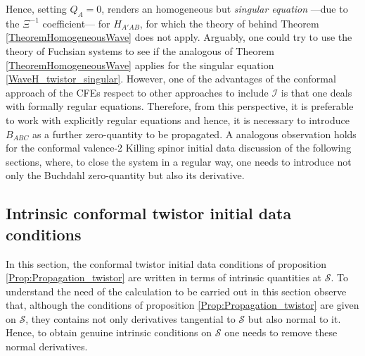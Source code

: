 \documentclass[10pt,a4paper]{article}
\theoremstyle{plain}
\begin{document}
Hence, setting $Q_{A}=0$, renders an homogeneous but
\emph{singular equation} ---due to the $\Xi^{-1}$ coefficient---
for $H_{A'AB}$, for which the theory of behind Theorem
\ref{TheoremHomogeneousWave} does not apply. Arguably, one could try
to use the theory of Fuchsian systems to see if the analogous of
Theorem \ref{TheoremHomogeneousWave} applies for the singular equation
\eqref{WaveH_twistor_singular}.  However, one of the advantages of the
conformal approach of the CFEs respect to other approaches to include
$\mathscr{I}$ is that one deals with formally regular equations.
Therefore, from this perspective,
it is preferable to work with explicitly regular equations and hence,
it is necessary to introduce $B_{ABC}$ as a further zero-quantity to
be propagated.  A analogous observation holds for the conformal valence-2
Killing spinor initial data discussion of the following sections,
where, to close the system in a regular way, one needs to introduce not
only the Buchdahl zero-quantity but also its derivative.





\subsection{Intrinsic conformal twistor initial data conditions}

In this section, the conformal twistor initial data conditions of
proposition \ref{Prop:Propagation_twistor} are written in terms of
intrinsic quantities at $\mathcal{S}$.  To understand the need of the
calculation to be carried out in this section observe that, although
the conditions of proposition \ref{Prop:Propagation_twistor} are given
on $\mathcal{S}$, they contains not only derivatives tangential to
$\mathcal{S}$ but also normal to it. Hence, to obtain genuine
intrinsic conditions on $\mathcal{S}$ one needs to remove these normal
derivatives.
\end{document}
